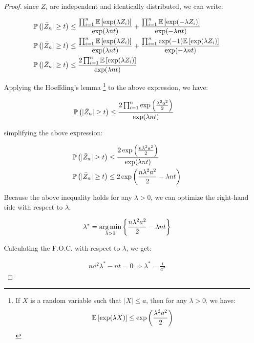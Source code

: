 \begin{proof}
since $Z_i$ are independent and identically distributed, we can write:

\begin{align*}
\mathbb{P}\left(|\bar{Z}_n| \geq t\right) &\leq
    \frac{\prod_{i=1}^n \mathbb{E}\left[\exp(\lambda Z_i)\right]}{\exp(\lambda nt)} + 
    \frac{\prod_{i=1}^n \mathbb{E}\left[\exp(-\lambda Z_i)\right]}{\exp(-\lambda nt)}\\
\mathbb{P}\left(|\bar{Z}_n| \geq t\right) &\leq
    \frac{\prod_{i=1}^n \mathbb{E}\left[\exp(\lambda Z_i)\right]}{\exp(\lambda nt)} + 
    \frac{\prod_{i=1}^n \exp(-1)\mathbb{E}\left[\exp(\lambda Z_i)\right]}{\exp(-\lambda nt)}\\
\mathbb{P}\left(|\bar{Z}_n| \geq t\right) &\leq
    \frac{2 \prod_{i=1}^n \mathbb{E}\left[\exp(\lambda Z_i)\right]}{\exp(\lambda nt)} 
\end{align*}

Applying the Hoeffding's lemma \footnote{
    If $X$ is a random variable such that $|X| \leq a$, then for any $\lambda > 0$, we have:
    \begin{align*}
    \mathbb{E}\left[\exp(\lambda X)\right] \leq \exp\left(\frac{\lambda^2a^2}{2}\right)
    \end{align*}
} to the above expression, we have:

\begin{align*}
\mathbb{P}\left(|\bar{Z}_n| \geq t\right) &\leq
    \frac{ 2 \prod_{i = 1}^n \exp\left(\frac{\lambda^2a^2}{2}\right)}{\exp(\lambda nt)} 
\end{align*}

simplifying the above expression:

\begin{align*}
\mathbb{P}\left(|\bar{Z}_n| \geq t\right) &\leq
    \frac{2 \exp\left(\frac{n\lambda^2a^2}{2}\right)}{\exp(\lambda nt)}\\
\mathbb{P}\left(|\bar{Z}_n| \geq t\right) &\leq
    2 \exp\left(\frac{n\lambda^2a^2}{2} - \lambda nt \right)\\
\end{align*}

Because the above inequality holds for any $\lambda > 0$, we can optimize the right-hand side with respect to $\lambda$.

\begin{align*}
\lambda^* = \operatorname*{arg\,min}_{\lambda > 0} \left\{ \frac{n\lambda^2a^2}{2} - \lambda nt \right\}
\end{align*}

Calculating the F.O.C. with respect to $\lambda$, we get:

\begin{align*}
n a^2 \lambda^* - nt = 0 \Rightarrow \lambda^* = \frac{t}{a^2}
\end{align*}


\end{proof}
